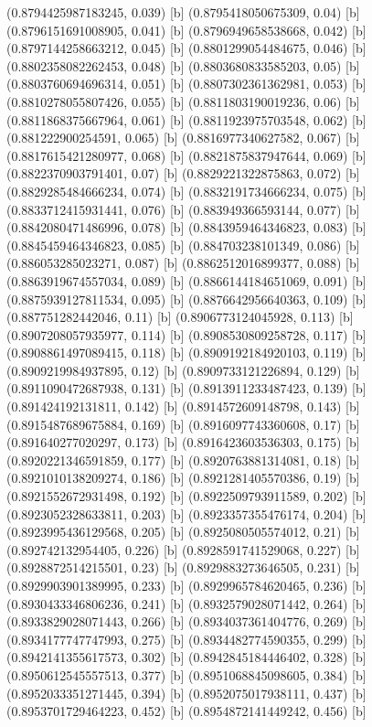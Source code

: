 {{{(0.8794425987183245, 0.039) [b] 
(0.8795418050675309, 0.04) [b] 
(0.8796151691008905, 0.041) [b] 
(0.8796949658538668, 0.042) [b] 
(0.8797144258663212, 0.045) [b] 
(0.8801299054484675, 0.046) [b] 
(0.8802358082262453, 0.048) [b] 
(0.8803680833585203, 0.05) [b] 
(0.8803760694696314, 0.051) [b] 
(0.8807302361362981, 0.053) [b] 
(0.8810278055807426, 0.055) [b] 
(0.8811803190019236, 0.06) [b] 
(0.8811868375667964, 0.061) [b] 
(0.8811923975703548, 0.062) [b] 
(0.881222900254591, 0.065) [b] 
(0.8816977340627582, 0.067) [b] 
(0.8817615421280977, 0.068) [b] 
(0.8821875837947644, 0.069) [b] 
(0.8822370903791401, 0.07) [b] 
(0.8829221322875863, 0.072) [b] 
(0.8829285484666234, 0.074) [b] 
(0.8832191734666234, 0.075) [b] 
(0.8833712415931441, 0.076) [b] 
(0.883949366593144, 0.077) [b] 
(0.8842080471486996, 0.078) [b] 
(0.8843959464346823, 0.083) [b] 
(0.8845459464346823, 0.085) [b] 
(0.884703238101349, 0.086) [b] 
(0.886053285023271, 0.087) [b] 
(0.8862512016899377, 0.088) [b] 
(0.8863919674557034, 0.089) [b] 
(0.8866144184651069, 0.091) [b] 
(0.8875939127811534, 0.095) [b] 
(0.8876642956640363, 0.109) [b] 
(0.887751282442046, 0.11) [b] 
(0.8906773124045928, 0.113) [b] 
(0.8907208057935977, 0.114) [b] 
(0.8908530809258728, 0.117) [b] 
(0.8908861497089415, 0.118) [b] 
(0.8909192184920103, 0.119) [b] 
(0.8909219984937895, 0.12) [b] 
(0.8909733121226894, 0.129) [b] 
(0.8911090472687938, 0.131) [b] 
(0.8913911233487423, 0.139) [b] 
(0.891424192131811, 0.142) [b] 
(0.8914572609148798, 0.143) [b] 
(0.8915487689675884, 0.169) [b] 
(0.8916097743360608, 0.17) [b] 
(0.891640277020297, 0.173) [b] 
(0.8916423603536303, 0.175) [b] 
(0.8920221346591859, 0.177) [b] 
(0.8920763881314081, 0.18) [b] 
(0.8921010138209274, 0.186) [b] 
(0.8921281405570386, 0.19) [b] 
(0.8921552672931498, 0.192) [b] 
(0.8922509793911589, 0.202) [b] 
(0.8923052328633811, 0.203) [b] 
(0.8923357355476174, 0.204) [b] 
(0.8923995436129568, 0.205) [b] 
(0.8925080505574012, 0.21) [b] 
(0.892742132954405, 0.226) [b] 
(0.8928591741529068, 0.227) [b] 
(0.8928872514215501, 0.23) [b] 
(0.8929883273646505, 0.231) [b] 
(0.8929903901389995, 0.233) [b] 
(0.8929965784620465, 0.236) [b] 
(0.8930433346806236, 0.241) [b] 
(0.8932579028071442, 0.264) [b] 
(0.8933829028071443, 0.266) [b] 
(0.8934037361404776, 0.269) [b] 
(0.8934177747747993, 0.275) [b] 
(0.8934482774590355, 0.299) [b] 
(0.8942141355617573, 0.302) [b] 
(0.8942845184446402, 0.328) [b] 
(0.8950612545557513, 0.377) [b] 
(0.8951068845098605, 0.384) [b] 
(0.8952033351271445, 0.394) [b] 
(0.8952075017938111, 0.437) [b] 
(0.8953701729464223, 0.452) [b] 
(0.8954872141449242, 0.456) [b] 
}}}
